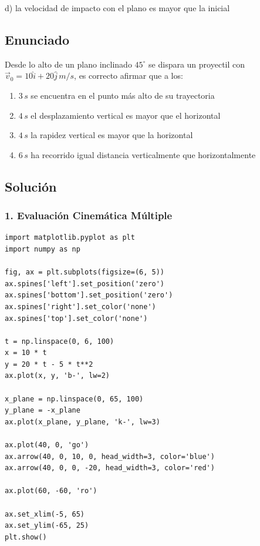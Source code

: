 \documentclass[12pt, a4paper]{article}
\begin{document}
\begin{tcolorbox}[colback=green!5!white, colframe=green!50!black, title=Respuesta Final]
\centering \Large d) la velocidad de impacto con el plano es mayor que la inicial
\end{tcolorbox}

\newpage

\subsection*{Enunciado}
Desde lo alto de un plano inclinado $45^\circ$ se dispara un proyectil con $\vec{v}_0 = 10\hat{i} + 20\hat{j} \,\si{m/s}$, es correcto afirmar que a los:
\begin{enumerate}[label=\alph*)]
    \item $3\,\si{s}$ se encuentra en el punto más alto de su trayectoria
    \item $4\,\si{s}$ el desplazamiento vertical es mayor que el horizontal
    \item $4\,\si{s}$ la rapidez vertical es mayor que la horizontal
    \item $6\,\si{s}$ ha recorrido igual distancia verticalmente que horizontalmente
\end{enumerate}

\subsection*{Solución}

\subsubsection*{1. Evaluación Cinemática Múltiple}

\begin{verbatim}
import matplotlib.pyplot as plt
import numpy as np

fig, ax = plt.subplots(figsize=(6, 5))
ax.spines['left'].set_position('zero')
ax.spines['bottom'].set_position('zero')
ax.spines['right'].set_color('none')
ax.spines['top'].set_color('none')

t = np.linspace(0, 6, 100)
x = 10 * t
y = 20 * t - 5 * t**2
ax.plot(x, y, 'b-', lw=2)

x_plane = np.linspace(0, 65, 100)
y_plane = -x_plane
ax.plot(x_plane, y_plane, 'k-', lw=3)

ax.plot(40, 0, 'go')
ax.arrow(40, 0, 10, 0, head_width=3, color='blue')
ax.arrow(40, 0, 0, -20, head_width=3, color='red')

ax.plot(60, -60, 'ro')

ax.set_xlim(-5, 65)
ax.set_ylim(-65, 25)
plt.show()
\end{verbatim}
\end{document}
